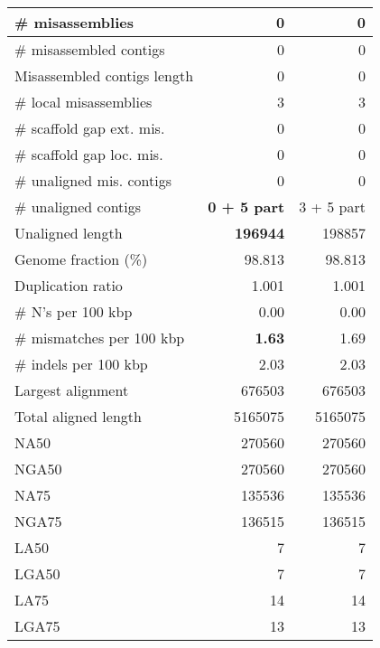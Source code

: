 \documentclass[12pt,a4paper]{article}
\begin{document}
\begin{table}[ht]
\begin{center}
\begin{tabular}{|l*{2}{|r}|}
\# misassemblies & 0 & 0 \\ \hline
\# misassembled contigs & 0 & 0 \\ \hline
Misassembled contigs length & 0 & 0 \\ \hline
\# local misassemblies & 3 & 3 \\ \hline
\# scaffold gap ext. mis. & 0 & 0 \\ \hline
\# scaffold gap loc. mis. & 0 & 0 \\ \hline
\# unaligned mis. contigs & 0 & 0 \\ \hline
\# unaligned contigs & {\bf 0 + 5 part} & 3 + 5 part \\ \hline
Unaligned length & {\bf 196944} & 198857 \\ \hline
Genome fraction (\%) & 98.813 & 98.813 \\ \hline
Duplication ratio & 1.001 & 1.001 \\ \hline
\# N's per 100 kbp & 0.00 & 0.00 \\ \hline
\# mismatches per 100 kbp & {\bf 1.63} & 1.69 \\ \hline
\# indels per 100 kbp & 2.03 & 2.03 \\ \hline
Largest alignment & 676503 & 676503 \\ \hline
Total aligned length & 5165075 & 5165075 \\ \hline
NA50 & 270560 & 270560 \\ \hline
NGA50 & 270560 & 270560 \\ \hline
NA75 & 135536 & 135536 \\ \hline
NGA75 & 136515 & 136515 \\ \hline
LA50 & 7 & 7 \\ \hline
LGA50 & 7 & 7 \\ \hline
LA75 & 14 & 14 \\ \hline
LGA75 & 13 & 13 \\ \hline
\end{tabular}
\end{center}
\end{table}
\end{document}
